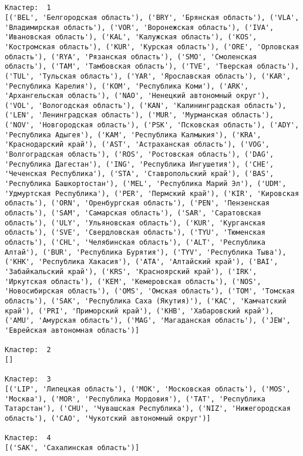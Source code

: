 \documentclass[11pt]{article}
\begin{document}
    \begin{center}
    \end{center}
    { \hspace*{\fill} \\}
    
    \begin{Verbatim}[commandchars=\\\{\}]

Кластер:  1
[('BEL', 'Белгородская область'), ('BRY', 'Брянская область'), ('VLA', 'Владимирская область'), ('VOR', 'Воронежская область'), ('IVA', 'Ивановская область'), ('KAL', 'Калужская область'), ('KOS', 'Костромская область'), ('KUR', 'Курская область'), ('ORE', 'Орловская область'), ('RYA', 'Рязанская область'), ('SMO', 'Смоленская область'), ('TAM', 'Тамбовская область'), ('TVE', 'Тверская область'), ('TUL', 'Тульская область'), ('YAR', 'Ярославская область'), ('KAR', 'Республика Карелия'), ('KOM', 'Республика Коми'), ('ARK', 'Архангельская область'), ('NAO', 'Ненецкий автономный округ'), ('VOL', 'Вологодская область'), ('KAN', 'Калинингpадская область'), ('LEN', 'Ленинградская область'), ('MUR', 'Мурманская область'), ('NOV', 'Новгородская область'), ('PSK', 'Псковская область'), ('ADY', 'Республика Адыгея'), ('KAM', 'Республика Калмыкия'), ('KRA', 'Краснодарский край'), ('AST', 'Астраханская область'), ('VOG', 'Волгоградская область'), ('ROS', 'Ростовская область'), ('DAG', 'Республика Дагестан'), ('ING', 'Республика Ингушетия'), ('CHE', 'Чеченская Республика'), ('STA', 'Ставропольский край'), ('BAS', 'Республика Башкортостан'), ('MEL', 'Республика Марий Эл'), ('UDM', 'Удмуртская Республика'), ('PER', 'Пермский край'), ('KIR', 'Кировская область'), ('ORN', 'Оренбургская область'), ('PEN', 'Пензенская область'), ('SAM', 'Самарская область'), ('SAR', 'Саратовская область'), ('ULY', 'Ульяновская область'), ('KUR', 'Курганская область'), ('SVE', 'Свердловская область'), ('TYU', 'Тюменская область'), ('CHL', 'Челябинская область'), ('ALT', 'Республика Алтай'), ('BUR', 'Республика Бурятия'), ('TYV', 'Республика Тыва'), ('KHK', 'Республика Хакасия'), ('ATA', 'Алтайский край'), ('BAI', 'Забайкальский край'), ('KRS', 'Красноярский край'), ('IRK', 'Иркутская область'), ('KEM', 'Кемеровская область'), ('NOS', 'Новосибирская область'), ('OMS', 'Омская область'), ('TOM', 'Томская область'), ('SAK', 'Республика Саха (Якутия)'), ('KAC', 'Камчатский край'), ('PRI', 'Приморский край'), ('KHB', 'Хабаровский край'), ('AMU', 'Амурская область'), ('MAG', 'Магаданская область'), ('JEW', 'Еврейская автономная область')]

Кластер:  2
[]

Кластер:  3
[('LIP', 'Липецкая область'), ('MOK', 'Московская область'), ('MOS', 'Москва'), ('MOR', 'Республика Мордовия'), ('TAT', 'Республика Татарстан'), ('CHU', 'Чувашская Республика'), ('NIZ', 'Нижегородская область'), ('CAO', 'Чукотский автономный округ')]

Кластер:  4
[('SAK', 'Сахалинская область')]

    \end{Verbatim}
\end{document}
